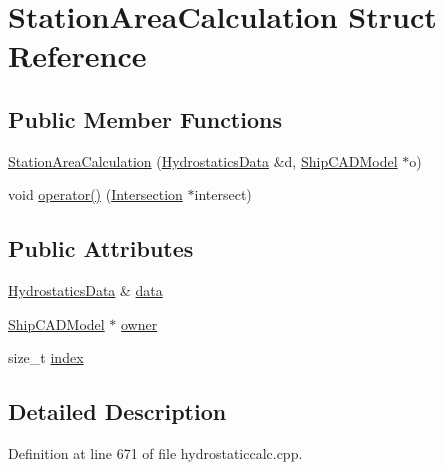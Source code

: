 \hypertarget{structStationAreaCalculation}{\section{Station\-Area\-Calculation Struct Reference}
\label{structStationAreaCalculation}
}
\subsection*{Public Member Functions}
\begin{DoxyCompactItemize}
\item 
\hyperlink{structStationAreaCalculation_aeca509dbb47e4d9eca53b5e0c959dd79}{Station\-Area\-Calculation} (\hyperlink{structShipCAD_1_1HydrostaticsData}{Hydrostatics\-Data} \&d, \hyperlink{classShipCAD_1_1ShipCADModel}{Ship\-C\-A\-D\-Model} $\ast$o)
\item 
void \hyperlink{structStationAreaCalculation_a8f6cf7b08869c75ac1c54bff232ce2ed}{operator()} (\hyperlink{classShipCAD_1_1Intersection}{Intersection} $\ast$intersect)
\end{DoxyCompactItemize}
\subsection*{Public Attributes}
\begin{DoxyCompactItemize}
\item 
\hyperlink{structShipCAD_1_1HydrostaticsData}{Hydrostatics\-Data} \& \hyperlink{structStationAreaCalculation_ad1b380c3cc7135b5d659c7efb5a961c2}{data}
\item 
\hyperlink{classShipCAD_1_1ShipCADModel}{Ship\-C\-A\-D\-Model} $\ast$ \hyperlink{structStationAreaCalculation_a84d2ad6a33b1d6e2db182bebf0a5d7af}{owner}
\item 
size\-\_\-t \hyperlink{structStationAreaCalculation_acc4a19c9d552a68803dd255c31350d8e}{index}
\end{DoxyCompactItemize}


\subsection{Detailed Description}


Definition at line 671 of file hydrostaticcalc.\-cpp.



